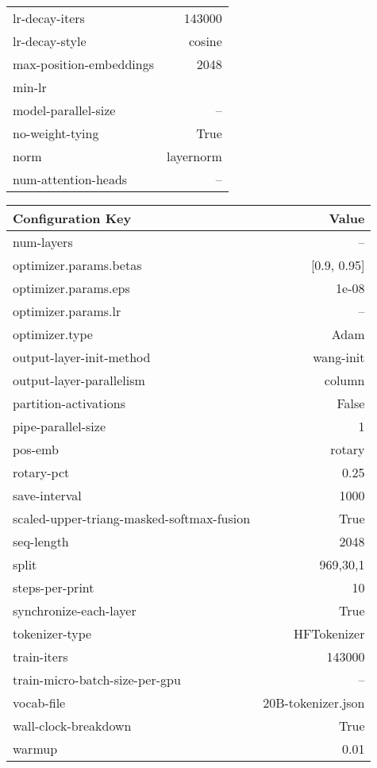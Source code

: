 \documentclass{article}
\theoremstyle{plain}
\theoremstyle{definition}
\theoremstyle{remark}
\begin{document}
\begin{table}[!ht]
\begin{subtable}[h]{0.48\textwidth}
\begin{tabular}{lr}
    lr-decay-iters & 143000 \\
    lr-decay-style & cosine \\
    max-position-embeddings & 2048 \\
    min-lr &  \\
    model-parallel-size & -- \\
    no-weight-tying & True \\
    norm & layernorm \\
    num-attention-heads & -- \\\bottomrule
\end{tabular}
\end{subtable}
\begin{subtable}[h]{0.48\textwidth}
\begin{tabular}{lr}
    \toprule
    Configuration Key                               & Value \\
    \midrule
    num-layers & -- \\
    optimizer.params.betas & [0.9, 0.95] \\
    optimizer.params.eps & 1e-08 \\
    optimizer.params.lr & -- \\
    optimizer.type & Adam \\
    output-layer-init-method & wang-init \\
    output-layer-parallelism & column \\
    partition-activations & False \\
    pipe-parallel-size & 1 \\
    pos-emb & rotary \\
    rotary-pct & 0.25 \\
    save-interval & 1000 \\
    scaled-upper-triang-masked-softmax-fusion & True \\
    seq-length & 2048 \\
    split & 969,30,1\\
    steps-per-print & 10 \\
    synchronize-each-layer & True \\
    tokenizer-type & HFTokenizer \\
    train-iters & 143000 \\
    train-micro-batch-size-per-gpu & -- \\
    vocab-file & 20B-tokenizer.json \\
    wall-clock-breakdown & True \\
    warmup & 0.01 \\

\end{tabular}
\end{subtable}
\end{table}
\end{document}
